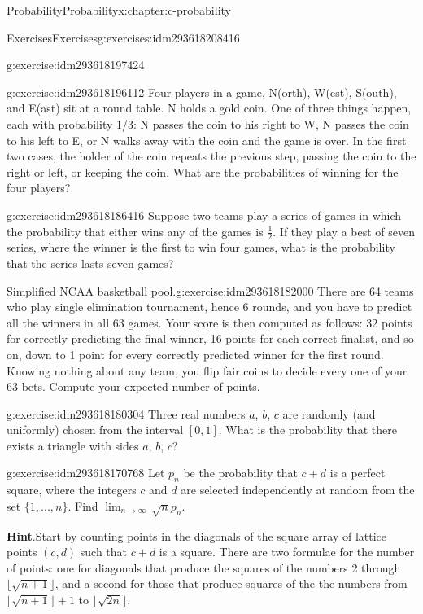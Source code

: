 \documentclass[twoside,10pt,]{book}
\newcommand{\blocktitlefont}{\relax}
\numberwithin{equation}{section}
\begin{document}
\begin{chapterptx}{Probability}{}{Probability}{}{}{x:chapter:c-probability}
\begin{exercises-section}{Exercises}{}{Exercises}{}{}{g:exercises:idm293618208416}
\begin{divisionexercise}{3}{}{}{g:exercise:idm293618197424}
\end{divisionexercise}%
\begin{divisionexercise}{4}{}{}{g:exercise:idm293618196112}%
Four players in a game, N(orth), W(est), S(outh), and E(ast) sit at a round table. N holds a gold coin. One of three things happen, each with probability 1\slash{}3: N passes the coin to his right to W, N passes the coin to his left to E, or N walks away with the coin and the game is over. In the first two cases, the holder of the coin repeats the previous step, passing the coin to the right or left, or keeping the coin. What are the probabilities of winning for the four players?%
\end{divisionexercise}%
\begin{divisionexercise}{5}{}{}{g:exercise:idm293618186416}%
Suppose two teams play a series of games in which the probability that either wins any of the games is \(\frac{1}{2}\).  If they play a best of seven series, where the winner is the first to win four games, what is the probability that the series lasts seven games?%
\end{divisionexercise}%
\begin{divisionexercise}{6}{Simplified NCAA basketball pool.}{}{g:exercise:idm293618182000}%
There are 64 teams who play single elimination tournament, hence 6 rounds, and you have to predict all the winners in all 63 games. Your score is then computed as follows: 32 points for correctly predicting the final winner, 16 points for each correct finalist, and so on, down to 1 point for every correctly predicted winner for the first round. Knowing nothing about any team, you flip fair coins to decide every one of your 63 bets. Compute your expected number of points.%
\end{divisionexercise}%
\begin{divisionexercise}{7}{}{}{g:exercise:idm293618180304}%
Three real numbers \(a\), \(b\), \(c\) are randomly (and uniformly) chosen from the interval \([0, 1]\). What is the probability that there exists a triangle with sides \(a\), \(b\), \(c\)?%
\end{divisionexercise}%
\begin{divisionexercise}{8}{}{}{g:exercise:idm293618170768}%
Let \(p_n\) be the probability that \(c + d\) is a perfect square, where the integers \(c\) and \(d\) are selected independently at random from the set \(\{1, . . . , n\}\). Find \(\lim_{n\to \infty } \, \sqrt{n} p_n\).%
\par\smallskip%
\noindent\textbf{\blocktitlefont Hint}.\label{g:hint:idm293618169136}{}\hypertarget{g:hint:idm293618169136}{}\quad{}Start by counting points in the diagonals of the square array of lattice points \((c,d)\) such that \(c+d\) is a square.  There are two formulae for the number of points: one for diagonals that produce the squares of the numbers 2 through \(\lfloor \sqrt{n+1} \rfloor\), and a second for those that produce squares of the the numbers from \(\lfloor \sqrt{n+1} \rfloor +1\) to \(\lfloor \sqrt{2n} \rfloor\).%

\end{divisionexercise}
\end{exercises-section}
\end{chapterptx}
\end{document}
